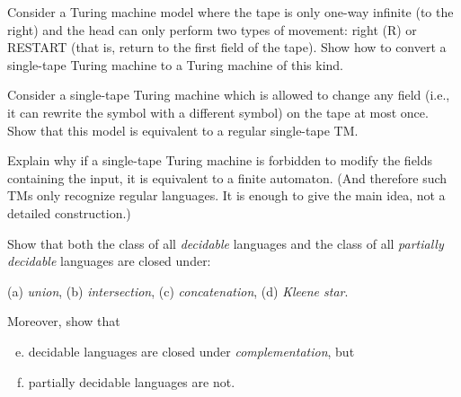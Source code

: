 \documentclass[a4paper,12pt]{amsart}
\begin{document}
\begin{problem}
    Consider a Turing machine model where the tape is only one-way infinite (to the right) and the head can only perform two types of movement:  right (R) or RESTART (that is, return to the first field of the tape). Show how to convert a single-tape Turing machine to a Turing machine of this kind.
\end{problem}
        

\begin{problem}

    Consider a single-tape Turing machine which is allowed to change any field (i.e., it can rewrite the symbol with a different symbol) on the tape at most once. Show that this model is equivalent to a regular single-tape TM.

\end{problem}
    

\begin{problem}

    Explain why if a single-tape Turing machine is forbidden to modify the fields containing the input, it is equivalent to a finite automaton. (And therefore such TMs only recognize regular languages. It is enough to give the main idea, not a detailed construction.)

\end{problem}
    

\begin{problem}
    
    Show that both the class of all \emph{decidable} languages and the class of all \emph{partially decidable} languages are closed under:
    
    (a) \emph{union}, (b) \emph{intersection}, (c) \emph{concatenation}, (d) \emph{Kleene star}.
    
    Moreover, show that 
    \begin{enumerate}[(a)]
    \setcounter{enumi}{4}
    \item decidable languages are closed under \emph{complementation}, but
    \item partially decidable languages are not.
    \end{enumerate}

\end{problem}
    
\end{document}
